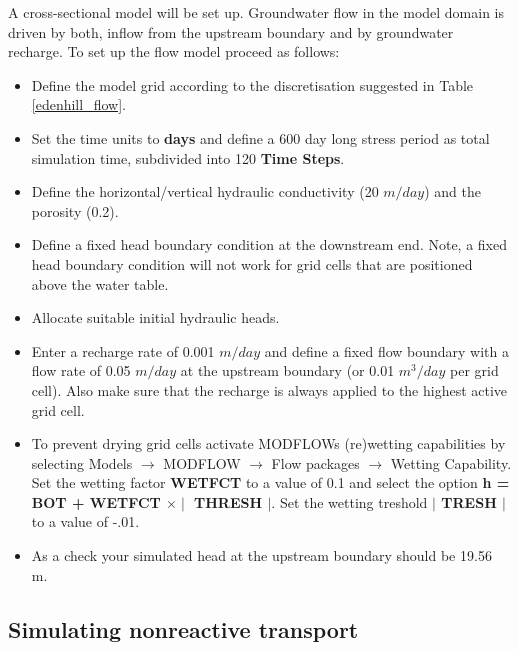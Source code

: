 A cross-sectional model will be set up.
Groundwater flow in the model domain is driven by both, inflow from the upstream boundary
and by groundwater recharge. To set up the flow model proceed as follows:

\begin{itemize} 

\item Define the model grid according to the discretisation suggested in Table \ref{edenhill_flow}.

\item Set the time units to {\color{red} \textbf{days}} and define a 600 day long stress period as total simulation time, subdivided into 120 {\color{red} \textbf{Time Steps}}. 

\item Define the horizontal/vertical hydraulic conductivity (20 $m/day$) and the porosity (0.2).

\item Define a fixed head boundary condition at the downstream end. Note, a fixed head
boundary condition will not work for grid cells that are positioned above the water table.

\item Allocate suitable initial hydraulic heads.

\item Enter a recharge rate of 0.001 $m/day$ and define a fixed flow boundary with 
a flow rate of 0.05 $m/day$ at the upstream boundary (or 0.01 $m^3/day$ per grid cell).
Also make sure that the recharge is always applied to the highest active grid cell.

\item To prevent drying grid cells activate MODFLOWs (re)wetting capabilities by selecting Models $\rightarrow$ MODFLOW $\rightarrow$ Flow packages $\rightarrow$ Wetting Capability.
Set the wetting factor {\color{red} \textbf{WETFCT}} to a value of 0.1 and select the option 
{\color{red} \textbf{h = BOT + WETFCT $\times \mid$ THRESH $\mid$}}. Set the wetting treshold
{\color{red} \textbf{$\mid$ TRESH $\mid$}} to a value of -.01.

\item As a check your simulated head at the upstream boundary should be 19.56 m.
\end{itemize} 

\subsection[Simulating nonreactive transport]{Simulating nonreactive transport}

